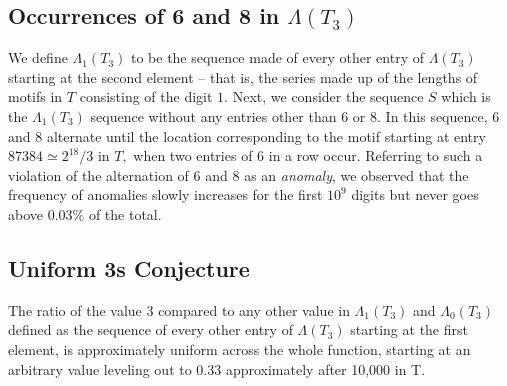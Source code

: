 \documentclass{article}
\begin{document}
\subsection{Occurrences of 6 and 8 in $\Lambda(T_3)$}
We define $\Lambda_1(T_3)$ to be the sequence made of every other entry of $\Lambda(T_3)$ starting at the second element -- that is, the series made up of the lengths of motifs in $T$ consisting of the digit $1.$ Next, we consider the sequence $S$ which is the $\Lambda_1(T_3)$ sequence without any entries other than $6$ or $8.$ In this sequence, $6$ and $8$ alternate until the location corresponding to the motif starting at entry $87384 \simeq 2^{18}/3$ in $T,$ when two entries of $6$ in a row occur. Referring to such a violation of the alternation of $6$ and $8$ as an \emph{anomaly}, we observed that the frequency of anomalies slowly increases for the first $10^9$ digits but never goes above $0.03\%$ of the total.

\subsection{Uniform 3s Conjecture}
The ratio of the value 3 compared to any other value in $\Lambda{_1(T_3)}$ and $\Lambda{_0(T_3)}$ defined as the sequence of every other entry of $\Lambda(T_3)$ starting at the first element, is approximately uniform across the whole function, starting at an arbitrary value leveling out to 0.33 approximately after 10,000 in T.
\end{document}
